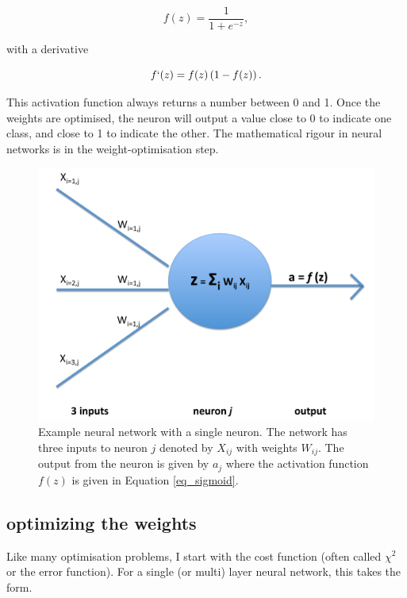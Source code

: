 \documentclass[10pt]{article}
\begin{document}
\begin{equation} 
f(z) = \frac{1}{1+e^{-z}},
\label{eq_sigmoid}
\end{equation}

\noindent with a derivative

\begin{equation} 
f`(z) = f(z) \left( 1 - f(z) \right).
\label{eq_sigmoid}
\end{equation}


\noindent This activation function always returns a number between 0 and 1. Once the weights are optimised, the neuron will output a value close to 0 to indicate one class, and close to 1 to indicate the other. The mathematical rigour in neural networks is in the weight-optimisation step. 


\begin{figure}
\includegraphics[scale=0.5,angle=0,trim=0cm 0cm 0.0cm 0cm]{diagrams.pdf}
\caption{Example neural network with a single neuron. The network has three inputs to neuron $j$ denoted by $X_{ij}$ with weights $W_{ij}$. The output from the neuron is given by $a_j$ where the activation function $f(z)$ is given in Equation \ref{eq_sigmoid}.}
\label{fig_temp}
\end{figure}


\subsection{optimizing the weights}

Like many optimisation problems, I start with the cost function (often called $\chi^2$ or the error function). For a single (or multi) layer neural network, this takes the form.
\end{document}
